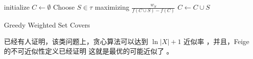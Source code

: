 \documentclass{ctexart}
\begin{document}
\begin{algorithm}[H]
	initialize $C \leftarrow \emptyset$ \;
	 {
		Choose $S \in \tau$ maximizing $\frac{w_S}{ f(C \cup {S}) - f(C) }$ \;
		$C \leftarrow C \cup {S}$ \;
	}
\caption{Greedy Weighted Set Covers}
\end{algorithm}

已经有人证明，该类问题上，贪心算法可以达到 $\ln |X| + 1$ 近似率 \cite{chivatal}，并且，Feige 的不可近似性定义已经证明
这就是最优的可能近似了 \cite{feige}。

\pagebreak

\end{document}
